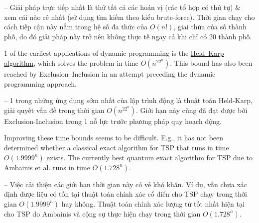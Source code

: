 \documentclass{article}
\begin{document}
-- Giải pháp trực tiếp nhất là thử tất cả các hoán vị (các tổ hợp có thứ tự) \& xem cái nào rẻ nhất (sử dụng tìm kiếm theo kiểu brute-force). Thời gian chạy cho cách tiếp cận này nằm trong hệ số đa thức của $O(n!)$, giai thừa của số thành phố, do đó giải pháp này trở nên không thực tế ngay cả khi chỉ có 20 thành phố.

1 of the earliest applications of dynamic programming is the \href{https://en.wikipedia.org/wiki/Held%E2%80%93Karp_algorithm}{Held--Karp algorithm}, which solves the problem in time $O(n^22^n)$. This bound has also been reached by Exclusion--Inclusion in an attempt preceding the dynamic programming approach.

-- 1 trong những ứng dụng sớm nhất của lập trình động là thuật toán Held-Karp, giải quyết vấn đề trong thời gian $O(n^22^n)$. Giới hạn này cũng đã đạt được bởi Exclusion-Inclusion trong 1 nỗ lực trước phương pháp quy hoạch động.

Improving these time bounds seems to be difficult. E.g., it has not been determined whether a classical exact algorithm for TSP that runs in time $O(1.9999^n)$ exists. The currently best quantum exact algorithm for TSP due to Ambainis et al. runs in time $O(1.728^n)$.

-- Việc cải thiện các giới hạn thời gian này có vẻ khó khăn. Ví dụ, vẫn chưa xác định được liệu có tồn tại thuật toán chính xác cổ điển cho TSP chạy trong thời gian $O(1.9999^n)$ hay không. Thuật toán chính xác lượng tử tốt nhất hiện tại cho TSP do Ambainis và cộng sự thực hiện chạy trong thời gian $O(1.728^n)$.
\end{document}
